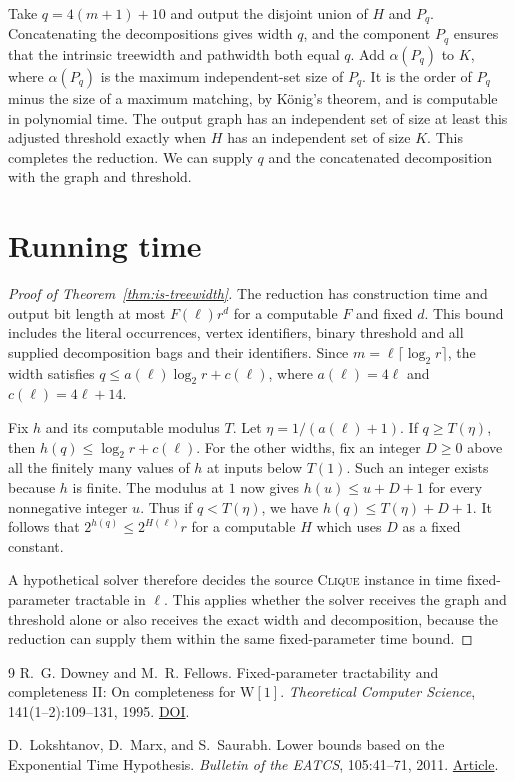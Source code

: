 \documentclass[11pt]{article}
\begin{document}
Take \(q=4(m+1)+10\) and output the disjoint union of \(H\) and \(P_q\).
Concatenating the decompositions gives width \(q\), and the component
\(P_q\) ensures that the intrinsic treewidth and pathwidth both equal
\(q\). Add \(\alpha(P_q)\) to \(K\), where \(\alpha(P_q)\) is the maximum
independent-set size of \(P_q\). It is the order of \(P_q\) minus the
size of a maximum matching, by K\"onig's theorem, and is computable
in polynomial time. The output graph has an independent set of size
at least this adjusted threshold exactly when \(H\) has an independent
set of size \(K\). This completes the reduction. We can supply \(q\)
and the concatenated decomposition with the graph and threshold.

\section{Running time}

\begin{proof}[Proof of Theorem~\ref{thm:is-treewidth}]
The reduction has construction time and output bit length at most
\(F(\ell)r^d\) for a computable \(F\) and fixed \(d\). This bound
includes the literal occurrences, vertex identifiers, binary threshold
and all supplied decomposition bags and their identifiers. Since
\(m=\ell\lceil\log_2 r\rceil\), the width satisfies
\(q\le a(\ell)\log_2 r+c(\ell)\), where \(a(\ell)=4\ell\) and
\(c(\ell)=4\ell+14\).

Fix \(h\) and its computable modulus \(T\). Let
\(\eta=1/(a(\ell)+1)\). If \(q\ge T(\eta)\), then
\(h(q)\le \log_2 r+c(\ell)\).
For the other widths, fix an integer \(D\ge0\) above all the finitely
many values of \(h\) at inputs below \(T(1)\). Such an integer exists
because \(h\) is finite. The modulus at \(1\) now gives
\(h(u)\le u+D+1\) for every nonnegative integer \(u\). Thus if
\(q<T(\eta)\), we have \(h(q)\le T(\eta)+D+1\).
It follows that \(2^{h(q)}\le 2^{H(\ell)}r\) for a computable
\(H\) which uses \(D\) as a fixed constant.

A hypothetical solver therefore decides the source \textsc{Clique}
instance in time fixed-parameter tractable in \(\ell\). This applies
whether the solver receives the graph and threshold alone or also
receives the exact width and decomposition, because the reduction
can supply them within the same fixed-parameter time bound.
\end{proof}

\begin{thebibliography}{9}
R.~G. Downey and M.~R. Fellows.
Fixed-parameter tractability and completeness II: On completeness for \(\mathrm{W}[1]\).
\emph{Theoretical Computer Science}, 141(1--2):109--131, 1995.
\href{https://doi.org/10.1016/0304-3975(94)00097-3}{DOI}.

D.~Lokshtanov, D.~Marx, and S.~Saurabh.
Lower bounds based on the Exponential Time Hypothesis.
\emph{Bulletin of the EATCS}, 105:41--71, 2011.
\href{https://bulletin.eatcs.org/index.php/beatcs/article/view/92}{Article}.
\end{thebibliography}
\end{document}
